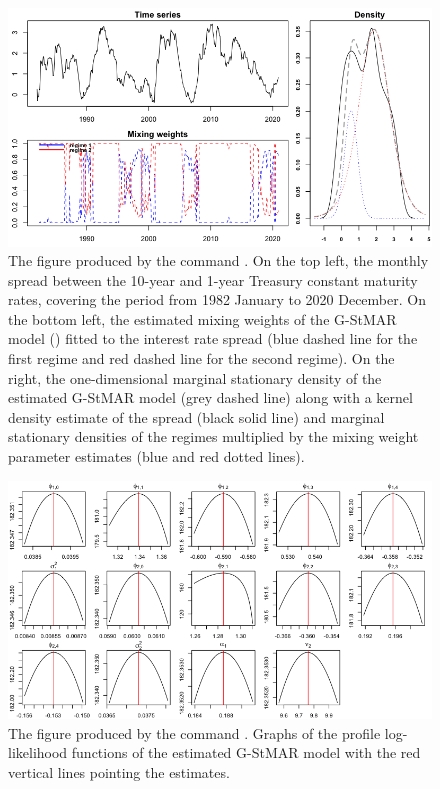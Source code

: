 \documentclass[nojss]{jss} %
\begin{document}
\begin{figure}[p]
  \centering
  \includegraphics{figures/plotfit42gs.png}
  \caption{The figure produced by the command . On the top left, the monthly spread between the 10-year and 1-year Treasury constant maturity rates, covering the period from 1982 January to 2020 December. On the bottom left, the estimated mixing weights of the G-StMAR model () fitted to the interest rate spread (blue dashed line for the first regime and red dashed line for the second regime). On the right, the one-dimensional marginal stationary density of the estimated G-StMAR model (grey dashed line) along with a kernel density estimate of the spread (black solid line) and marginal stationary densities of the regimes multiplied by the mixing weight parameter estimates (blue and red dotted lines).}
\label{fig:fit42gs}
\end{figure}

\begin{figure}[p]
  \centering
  \includegraphics{figures/proflogfit42gs.png}
  \caption{The figure produced by the command . Graphs of the profile log-likelihood functions of the estimated G-StMAR model  with the red vertical lines pointing the estimates.}
\label{fig:proflogfit42gs}
\end{figure}
\end{document}
